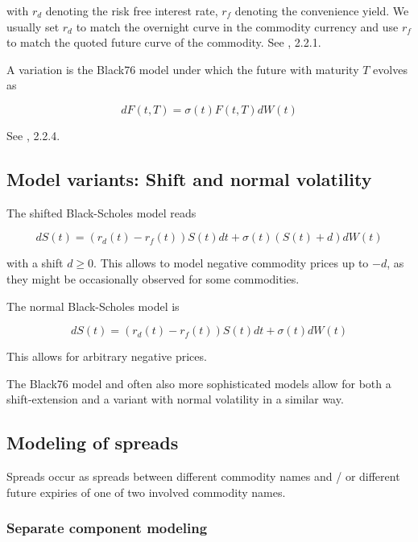 \documentclass{amsart}
\theoremstyle{plain}
\numberwithin{equation}{section}
\begin{document}
with $r_d$ denoting the risk free interest rate, $r_f$ denoting the convenience yield. We usually set $r_d$ to match the
overnight curve in the commodity currency and use $r_f$ to match the quoted future curve of the commodity. See \cite{Clark_2014}, 2.2.1.

A variation is the Black76 model under which the future with maturity $T$ evolves as

\begin{equation}
dF(t,T) = \sigma(t) F(t,T) dW(t)
\end{equation}

See \cite{Clark_2014}, 2.2.4.

\subsection{Model variants: Shift and normal volatility}

The shifted Black-Scholes model reads

\begin{equation}
dS(t) = (r_d(t) - r_f(t)) S(t) dt + \sigma(t) (S(t) + d) dW(t)
\end{equation}

with a shift $d \geq 0$. This allows to model negative commodity prices up to $-d$, as they might be occasionally
observed for some commodities.

The normal Black-Scholes model is

\begin{equation}
dS(t) = (r_d(t) - r_f(t)) S(t) dt + \sigma(t) dW(t)
\end{equation}

This allows for arbitrary negative prices.

The Black76 model and often also more sophisticated models allow for both a shift-extension and a variant with normal
volatility in a similar way.

\subsection{Modeling of spreads}

Spreads occur as spreads between different commodity names and / or different future expiries of one of two involved commodity names.

\subsubsection{Separate component modeling}
\end{document}
